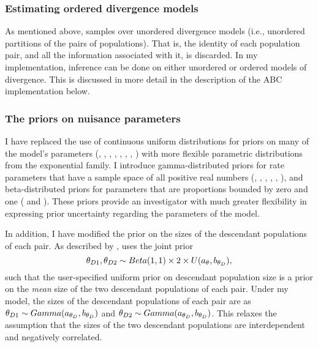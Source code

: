 \subsubsection{Estimating ordered divergence models}
As mentioned above, \msb samples over unordered divergence models
(i.e., unordered partitions of the \npairs{} pairs of populations).
That is, the identity of each population pair, and all the information
associated with it, is discarded.
In my implementation, inference can be done on either unordered or ordered
models of divergence.
This is discussed in more detail in the description of the ABC implementation
below.

\subsubsection{The priors on nuisance parameters}
I have replaced the use of continuous uniform distributions for priors on many
of the model's parameters (\divTime{}, \ancestralTheta{},
, , ,
, \recombinationRate, \migrationRate{}) with more flexible
parametric distributions from the exponential family.
I introduce gamma-distributed priors for rate parameters that have a sample
space of all positive real numbers (\divTime{}, \ancestralTheta{},
, , \recombinationRate,
\migrationRate{}), and beta-distributed priors for parameters that are
proportions bounded by zero and one ( and
).
These priors provide an investigator with much greater flexibility in
expressing prior uncertainty regarding the parameters of the model.

In addition, I have modified the prior on the sizes of the descendant
populations of each pair.
As described by \citet{Oaks2012}, \msb uses the joint prior
\begin{equation}
    \descendantTheta{1}{}, \descendantTheta{2}{} \sim
    Beta(1,1) \times 2 \times U(\uniformMin{\myTheta{}},
    \uniformMax{\descendantTheta{}{}}),
    \label{eq:jointThetaPrior}
\end{equation}
such that the user-specified uniform prior on descendant population
size is a prior on the \emph{mean} size of the two descendant
populations of each pair.
Under my model, the sizes of the descendant populations of each
pair are \iid as
$\descendantTheta{1}{} \sim Gamma(\gammaShape{\descendantTheta{}{}},
\gammaScale{\descendantTheta{}{}})$
and
$\descendantTheta{2}{} \sim Gamma(\gammaShape{\descendantTheta{}{}},
\gammaScale{\descendantTheta{}{}})$.
This relaxes the assumption that the sizes of the two descendant populations
are interdependent and negatively correlated.

